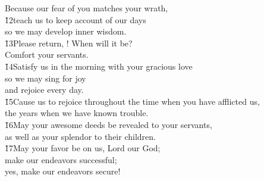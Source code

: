 \begin{poetry}
\poemll    Because our fear of you matches your wrath, \\
\poeml \v{12}teach us to keep account of our days \\
\poemll    so we may develop inner wisdom. \\
\poeml \v{13}Please return, ! When will it be? \\
\poemll    Comfort your servants. \\
\poeml \v{14}Satisfy us in the morning with your gracious love \\
\poemll    so we may sing for joy \\
\poemlll       and rejoice every day. \\
\poeml \v{15}Cause us to rejoice throughout the time when you have afflicted us, \\
\poemll    the years when we have known trouble. \\
\poeml \v{16}May your awesome deeds be revealed to your servants, \\
\poemll    as well as your splendor to their children. \\
\poeml \v{17}May your favor be on us, Lord our God; \\
\poemll    make our endeavors successful; \\
\poemlll       yes, make our endeavors secure!
\end{poetry}

